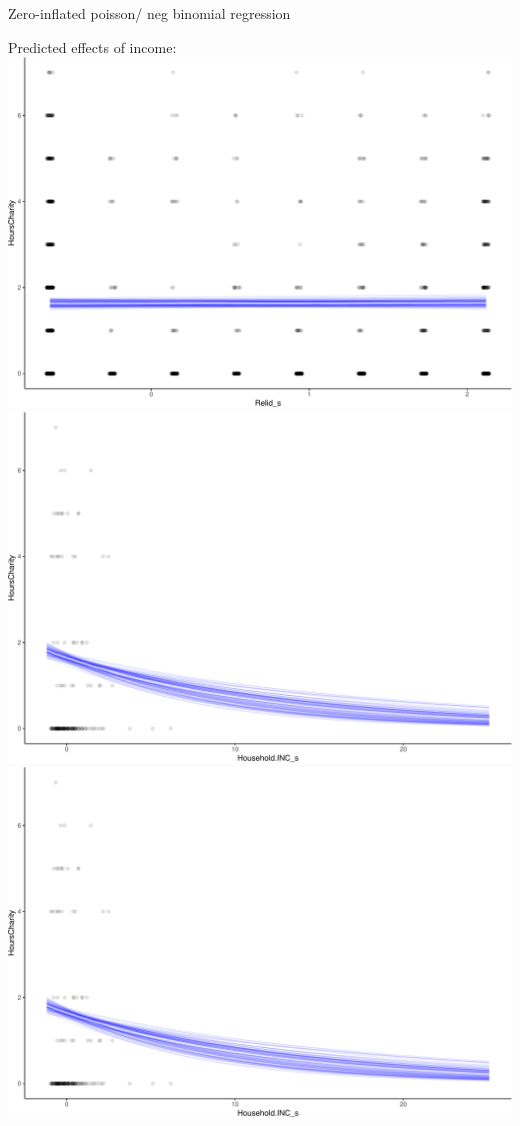 \documentclass[
  ignorenonframetext,
]{beamer}
\begin{document}
\begin{frame}[fragile]{Zero-inflated poisson/ neg binomial regression}
\begin{block}{Predicted effects of income:}
\protect\hypertarget{predicted-effects-of-income}{}
\includegraphics{slides_files/figure-beamer/unnamed-chunk-55-1.pdf}
\includegraphics{slides_files/figure-beamer/unnamed-chunk-55-2.pdf}
\includegraphics{slides_files/figure-beamer/unnamed-chunk-55-3.pdf}
\end{block}


\end{frame}
\end{document}
